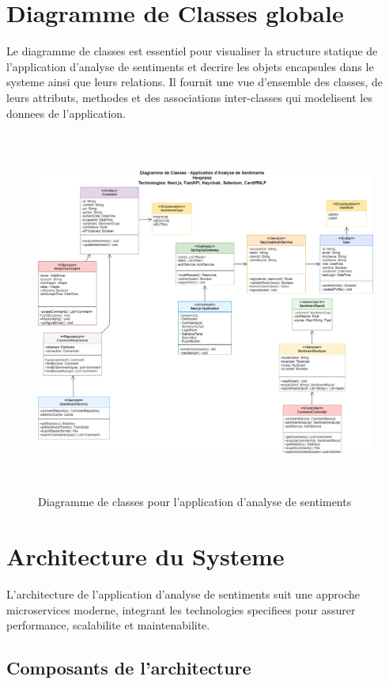 \section{Diagramme de Classes globale}

Le diagramme de classes est essentiel pour visualiser la structure statique de l'application d'analyse de sentiments et decrire les objets encapsules dans le systeme ainsi que leurs relations. Il fournit une vue d'ensemble des classes, de leurs attributs, methodes et des associations inter-classes qui modelisent les donnees de l'application.

\begin{figure}[H]
\centering
\includegraphics[height=12cm , width=\textwidth]{assets/images/class.png}
\caption{Diagramme de classes pour l'application d'analyse de sentiments}
\label{fig:class-global}
\end{figure}

\section{Architecture du Systeme}

L'architecture de l'application d'analyse de sentiments suit une approche microservices moderne, integrant les technologies specifiees pour assurer performance, scalabilite et maintenabilite.


\subsection{Composants de l'architecture}

